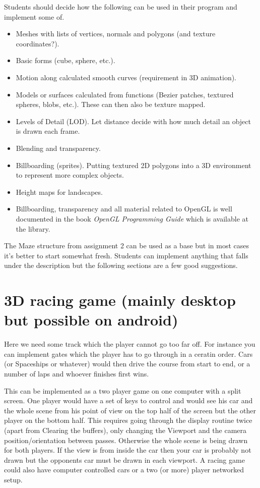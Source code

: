 \documentclass[12pt]{article}
\begin{document}
Students should decide how the following can be used in their program and implement some of.
\begin{itemize}
\item
Meshes with lists of vertices, normals and polygons (and texture coordinates?).
\item
Basic forms (cube, sphere, etc.).
\item
Motion along calculated smooth curves (requirement in 3D animation).
\item
Models or surfaces calculated from functions (Bezier patches, textured spheres, blobs, etc.). These can then also be texture mapped.
\item
Levels of Detail (LOD). Let distance decide with how much detail an object is drawn each frame.
\item
Blending and transparency.
\item
Billboarding (sprites). Putting textured 2D polygons into a 3D environment to represent more complex objects.
\item
Height maps for landscapes.
\item
Billboarding, transparency and all material related to OpenGL is well documented in the book \emph{OpenGL Programming Guide} which is available at the library.
\end{itemize}

The Maze structure from assignment 2 can be used as a base but in most cases it's better to start somewhat fresh.
Students can implement anything that falls under the description but the following sections are a few good suggestions.

\section*{3D racing game (mainly desktop but possible on android)}
Here we need some track which the player cannot go too far off. For instance you can implement gates which the player has to go through in a ceratin order. Cars (or Spaceships or whatever) would then drive the course from start to end, or a number of laps and whoever finishes first wins.

This can be implemented as a two player game on one computer with a split screen. One player would have a set of keys to control and would see his car and the whole scene from his point of view on the top half of the screen but the other player on the bottom half. This requires going through the display routine twice (apart from Clearing the buffers), only changing the Viewport and the camera position/orientation between passes. Otherwise the whole scene is being drawn for both players. If the view is from inside the car then your car is probably not drawn but the opponents car must be drawn in each viewport.
A racing game could also have computer controlled cars or a two (or more) player networked setup.
\end{document}

